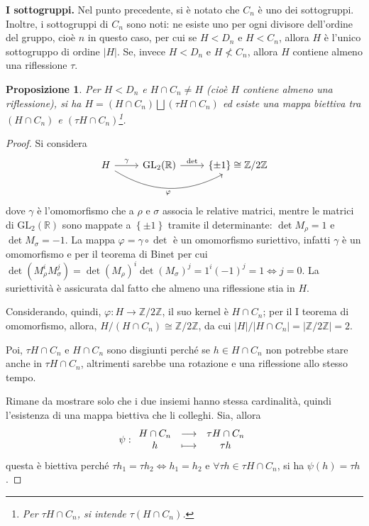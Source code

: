 \documentclass[11pt]{article}
\theoremstyle{style}
\newtheorem{prop}{Proposizione}[section]
\numberwithin{equation}{subsection}
\renewcommand{\textbf}[1]{\textsf{\bfseries #1}}
\begin{document}
 \textbf{I sottogruppi.} 
Nel punto precedente, si \`e notato che $C_n$ \`e uno dei sottogruppi.
Inoltre, i sottogruppi di $C_n$ sono noti: ne esiste uno per ogni divisore dell'ordine del gruppo, cio\`e $n$ in questo caso, per cui se $H < D_n$ e $H < C_n$, allora $H$ \`e l'unico sottogruppo di ordine $\lvert H \rvert $.
Se, invece $H< D_n$ e $H \not < C_n$, allora $H$ contiene almeno una riflessione $\tau $.
\begin{prop}
	Per $H < D_n$ e $H\cap C_n \neq H$ (cio\`e $H$ contiene almeno una riflessione), si ha $H=(H \cap C_n) \bigsqcup (\tau H \cap C_n) $ ed esiste una mappa biettiva tra $(H\cap C_n)$ e $(\tau H\cap C_n)$\footnote{Per $\tau H\cap C_n$, si intende $\tau (H\cap C_n)$.}.
\end{prop}
	\begin{proof}
		Si considera 
	\[
\begin{tikzcd}
H \arrow[r, "\gamma"] 
    \arrow[rr, bend right=30, "{\varphi }"'] & 
\mathrm{GL}_2(\mathbb{R}) \arrow[r, "\det"] & \{\pm 1\}\cong \mathbb{Z}/2\mathbb{Z}
\end{tikzcd}
\]
dove $\gamma$ \`e l'omomorfismo che a $\rho $ e $\sigma $ associa le relative matrici, mentre le matrici di $\mathrm{GL} _2(\mathbb{R})$ sono mappate a $\left\{ \pm 1 \right\} $ tramite il determinante: $\det M_\rho  = 1$ e $\det M_\sigma = -1$.
La mappa $\varphi = \gamma\circ \det$ \`e un omomorfismo suriettivo, infatti $\gamma$ \`e un omomorfismo e per il teorema di Binet per cui $\det (M^i_\rho M^j_\sigma ) = \det(M_\rho )^i \det (M_\sigma )^j = 1 ^i (-1)^j = 1 \iff j= 0$. 
La suriettivit\`a \`e assicurata dal fatto che almeno una riflessione stia in $H$.

Considerando, quindi, $\varphi  :H \to \mathbb{Z} / 2\mathbb{Z}$, il suo kernel \`e $H\cap C_n$; per il I teorema di omomorfismo, allora, $H / (H\cap C_n) \cong \mathbb{Z} / 2\mathbb{Z}$, da cui $\lvert H \rvert / \lvert H\cap C_n \rvert = \lvert \mathbb{Z} / 2 \mathbb{Z} \rvert =2$.

Poi, $\tau H \cap C_n$ e $ H \cap C_n$ sono disgiunti perch\'e se $h \in H\cap C_n$ non potrebbe stare anche in $\tau H\cap C_n$, altrimenti sarebbe una rotazione e una riflessione allo stesso tempo.

Rimane da mostrare solo che i due insiemi hanno stessa cardinalit\`a, quindi l'esistenza di una mappa biettiva che li colleghi.
Sia, allora
\[
\psi  : 
\begin{array}
	{c c c}
	H \cap C_n & \longrightarrow  & \tau  H \cap C_n\\
	h & \longmapsto &\tau  h
\end{array}
\] 
questa \`e biettiva perch\'e $\tau h_1=\tau h_2 \iff h_1=h_2$ e $\forall \tau h\in \tau H \cap C_n$, si ha $\psi (h)=\tau h $.
\end{proof}
\end{document}
